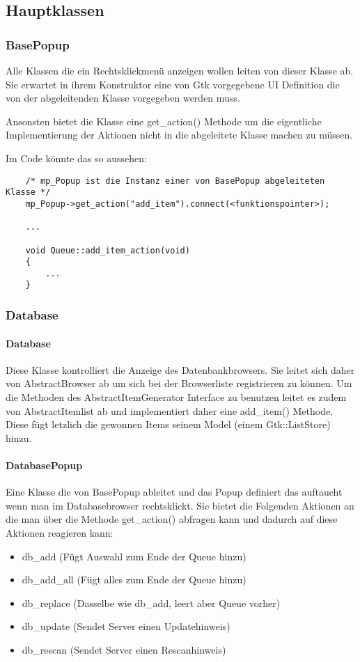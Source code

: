 \subsection{Hauptklassen}
\subsubsection{BasePopup}
Alle Klassen die ein Rechtsklickmenü anzeigen wollen leiten von dieser Klasse ab.
Sie erwartet in ihrem Konstruktor eine von Gtk vorgegebene UI Definition die von der abgeleitenden Klasse vorgegeben werden muss.

Ansonsten bietet die Klasse eine get\_action() Methode um die eigentliche Implementierung der Aktionen nicht in die abgeleitete Klasse machen zu müssen.

Im Code könnte das so aussehen:
\begin{verbatim}
    /* mp_Popup ist die Instanz einer von BasePopup abgeleiteten Klasse */
    mp_Popup->get_action("add_item").connect(<funktionspointer>);

    ...

    void Queue::add_item_action(void)
    {
        ...
    }
\end{verbatim}


\subsubsection{Database}
\paragraph{Database}
Diese Klasse kontrolliert die Anzeige des Datenbankbrowsers. Sie leitet sich daher von AbstractBrowser ab um sich bei der Browserliste registrieren zu können.
Um die Methoden des AbstractItemGenerator Interface zu benutzen leitet es zudem von AbstractItemlist ab und implementiert daher eine add\_item() Methode. 
Diese fügt letzlich die gewonnen Items seinem Model (einem Gtk::ListStore) hinzu.

\paragraph{DatabasePopup}
Eine Klasse die von BasePopup ableitet und das Popup definiert das auftaucht wenn man im Databasebrowser rechtsklickt.
Sie bietet die Folgenden Aktionen an die man über die Methode get\_action() abfragen kann und dadurch auf diese Aktionen reagieren kann:
\begin{itemize}
\item db\_add (Fügt Auswahl zum Ende der Queue hinzu)
\item db\_add\_all (Fügt alles zum Ende der Queue hinzu)
\item db\_replace (Dasselbe wie db\_add, leert aber Queue vorher)
\item db\_update (Sendet Server einen Updatehinweis)
\item db\_rescan (Sendet Server einen Rescanhinweis)
\end{itemize}

